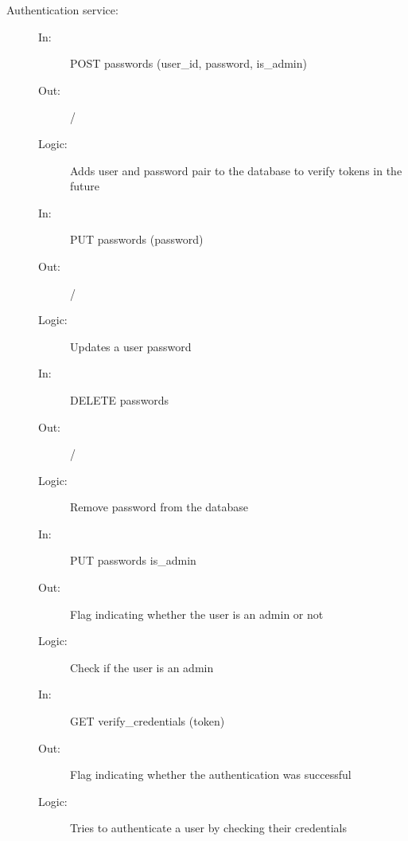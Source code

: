 \documentclass{article}
\begin{document}
\begin{description}
    \item [Authentication service:]
    \begin{description}
        \item[]
        \item[In:] POST passwords (user\_id, password, is\_admin)
        \item[Out:] /
        \item[Logic:] Adds user and password pair to the database to verify tokens in the future
    \end{description}
    \begin{description}
        \item[]
        \item[In:] PUT passwords (password)
        \item[Out:] /
        \item[Logic:] Updates a user password
    \end{description}
    \begin{description}
        \item[]
        \item[In:] DELETE passwords
        \item[Out:] /
        \item[Logic:] Remove password from the database
    \end{description}
    \begin{description}
        \item[]
        \item[In:] PUT passwords is\_admin
        \item[Out:] Flag indicating whether the user is an admin or not
        \item[Logic:] Check if the user is an admin
    \end{description}
    \begin{description}
        \item[]
        \item[In:] GET verify\_credentials (token)
        \item[Out:] Flag indicating whether the authentication was successful
        \item[Logic:] Tries to authenticate a user by checking their credentials
    \end{description}
\end{description}
\end{document}
